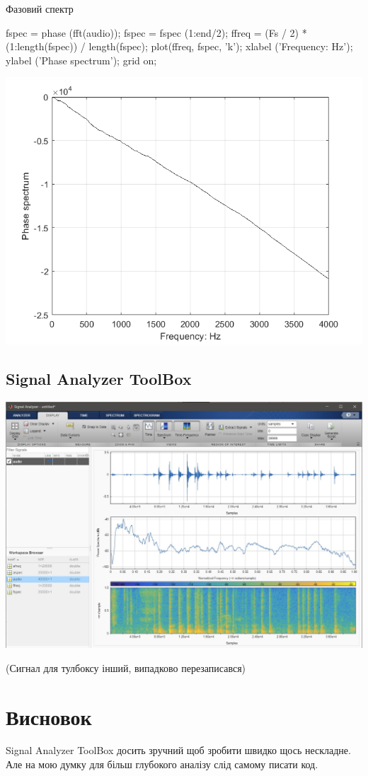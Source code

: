 \documentclass[12pt]{article}
\begin{document}
    \begin{par}
    \begin{flushleft}
    Фазовий спектр
    \end{flushleft}
    \end{par}

    \begin{matlabcode}
    fspec = phase (fft(audio));
    fspec = fspec (1:end/2);
    ffreq = (Fs / 2) * (1:length(fspec)) / length(fspec);
    plot(ffreq, fspec, 'k');
    xlabel ('Frequency: Hz'); ylabel ('Phase spectrum');
grid on;
\end{matlabcode}
\begin{center}
\includegraphics[width=\maxwidth{56.196688409433015em}]{figure_3}
\end{center}

\subsection*{Signal Analyzer ToolBox}
\begin{center}
    \includegraphics[scale=0.5]{Screenshot_1.jpg}
\end{center}
(Сигнал для тулбоксу інший, випадково перезаписався)

\section{Висновок}
Signal Analyzer ToolBox досить зручний щоб зробити швидко щось нескладне.
Але на мою думку для більш глубокого аналізу слід самому писати код.
\end{document}
